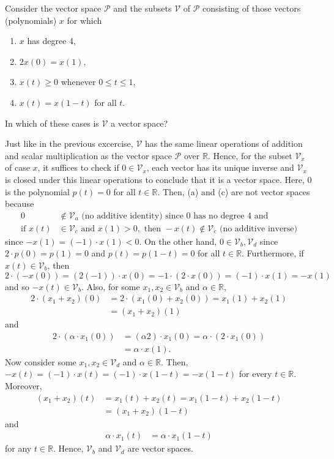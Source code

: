 \documentclass[12pt]{article}
\newcommand{\R}{\mathbb{R}}
\newenvironment{problem}[2][Problem]{\begin{trivlist} \item[\hskip \labelsep {\bfseries #1}\hskip \labelsep {\bfseries #2.}]}{\end{trivlist}}
\newenvironment{solution}[1][Solution]{\begin{trivlist} \item[\hskip \labelsep {\bfseries #1}]}{\end{trivlist}}
\begin{document}
\begin{problem}{5}
  Consider the vector space $\mathcal{P}$ and the subsets $\mathcal{V}$ of $\mathcal{P}$ consisting of those vectors (polynomials) $x$ for which
\begin{enumerate}
  \item $x$ has degree 4,
  \item $2x(0) = x(1)$,
  \item $x(t)\geq 0$ whenever $0\leq t \leq 1$,
  \item $x(t) = x(1-t)$ for all $t$.
\end{enumerate}
In which of these cases is $\mathcal{V}$ a vector space?
\begin{solution}
  Just like in the previous excercise, $\mathcal{V}$ has the same linear operations of addition and scalar multiplication as the vector space $\mathcal{P}$ over $\R$. Hence, for the subset $\mathcal{V}_{x}$ of case $x$, it suffices to check if  $0\in \mathcal{V}_{x}$, each vector has its unique inverse and $\mathcal{V}_{x}$ is closed under this linear operations to conclude that it is a vector space. Here, $0$ is the polynomial $p(t)=0$ for all $t\in \R$.
  Then, (a) and (c) are not vector spaces because 
\begin{align*}
0 &\not\in \mathcal{V}_{a} \text{ (no additive identity) since 0 has no degree 4 and}\\
  \text{if }x(t)&\in\mathcal{V}_{c}\text{ and }x(1)>0,\text{ then } -x(t)\not\in \mathcal{V}_{c} \text{ (no additive inverse)} 
\end{align*}
since $-x(1) = (-1)\cdot x(1)<0$. On the other hand, $0\in \mathcal{V}_{b},\mathcal{V}_{d}$ since $2\cdot p(0) = p(1) = 0$ and $p(t) = p(1-t)=0$ for all $t\in \R$. Furthermore, if $x(t) \in \mathcal{V}_{b}$, then $2\cdot(-x(0)) = (2(-1))\cdot x(0) = -1\cdot(2\cdot x(0)) = (-1)\cdot x(1) = -x(1)$ and so $-x(t)\in \mathcal{V}_{b}$. Also, for some $x_{1},x_{2}\in \mathcal{V}_{b}$ and $\alpha\in\R$,
\begin{align*}
  2\cdot(x_{1}+x_{2})(0) &= 2\cdot(x_{1}(0) + x_{2}(0)) = x_{1}(1) +x_{2}(1)\\
  &= (x_{1}+x_{2})(1)
\end{align*}
and 
\begin{align*}
  2\cdot(\alpha\cdot x_{1}(0)) &= (\alpha 2)\cdot x_{1}(0) = \alpha\cdot (2\cdot x_{1}(0))\\
  &= \alpha \cdot x(1).
\end{align*}
Now consider some $x_{1},x_{2}\in \mathcal{V}_{d}$ and $\alpha\in \R$. Then, $-x(t) = (-1)\cdot x(t) = (-1)\cdot x(1-t) = -x(1-t)$ for every $t\in \R$. Moreover,  
\begin{align*}
  (x_{1}+x_{2})(t) &= x_{1}(t) + x_{2}(t) = x_{1}(1-t) + x_{2}(1-t)\\
  &= (x_{1}+x_{2})(1-t) 
\end{align*}
and
\begin{align*}
  \alpha\cdot x_{1}(t) &= \alpha \cdot x_{1}(1-t)
\end{align*}
for any $t\in\R$. Hence, $\mathcal{V}_{b}$ and $\mathcal{V}_{d}$ are vector spaces.
\end{solution}
\end{problem}
\end{document}
